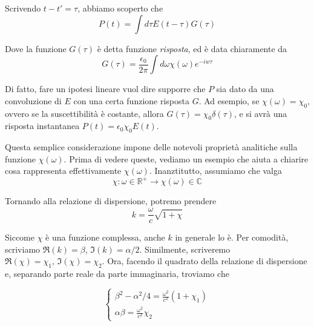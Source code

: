 \documentclass{report}
\begin{document}
Scrivendo $t-t' = \tau$, abbiamo scoperto che 
\begin{equation}
    P(t) = \int d\tau E(t-\tau)G(\tau)
\end{equation}

Dove la funzione $G(\tau)$ è detta funzione \emph{risposta}, ed è data chiaramente da 
\begin{equation}
    G(\tau) = \frac{\epsilon_0}{2\pi}\int d\omega \chi(\omega)e^{-iw\tau}
\end{equation}

Di fatto, fare un ipotesi lineare vuol dire supporre che $P$ sia dato da una convoluzione di $E$ con una certa funzione risposta $G$. Ad esempio, se $\chi(\omega) = \chi_0$, ovvero se la suscettibilità è costante, allora $G(\tau) = \chi_0\delta(\tau)$, e si avrà una risposta instantanea $P(t) = \epsilon_0\chi_0E(t)$. \\




Questa semplice considerazione impone delle notevoli proprietà analitiche sulla funzione $\chi(\omega)$. Prima di vedere queste, vediamo un esempio che aiuta a chiarire cosa rappresenta effettivamente $\chi(\omega)$. Inanztitutto, assumiamo che valga 
\begin{equation}
    \chi : \omega \in \mathbb{R}^+ \rightarrow \chi(\omega) \in \mathbb{C}
\end{equation}

Tornando alla relazione di dispersione, potremo prendere 
\begin{equation}
    k = \frac{\omega}{c}\sqrt{1+\chi}
\end{equation}

Siccome $\chi$ è una funzione complessa, anche $k$ in generale lo è. Per comodità, scriviamo $\Re{(k)} = \beta$, $\Im{(k)} = \alpha/2$. Similmente, scriveremo $\Re{(\chi)} = \chi_1, \, \Im{(\chi)} = \chi_2$. 
Ora, facendo il quadrato della relazione di dispersione e, separando parte reale da parte immaginaria, troviamo che 

\[\begin{cases}
    \beta^2 - \alpha^2/4 = \frac{\omega^2}{c^2}(1+\chi_1) \\
    \alpha\beta = \frac{\omega^2}{c^2}\chi_2
\end{cases}\]
\end{document}
